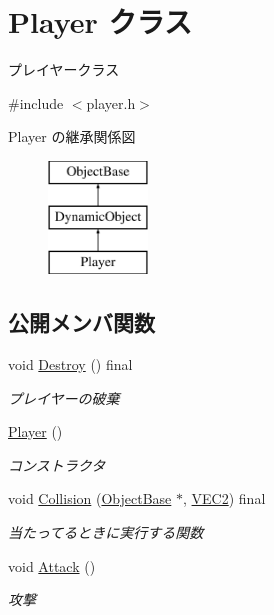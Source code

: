 \hypertarget{class_player}{}\section{Player クラス}
\label{class_player}


プレイヤークラス  




{\ttfamily \#include $<$player.\+h$>$}

Player の継承関係図\begin{figure}[H]
\begin{center}
\leavevmode
\includegraphics[height=3.000000cm]{class_player}
\end{center}
\end{figure}
\subsection*{公開メンバ関数}
\begin{DoxyCompactItemize}
\item 
void \mbox{\hyperlink{class_player_af2cf4936165ef12cce96f7994e0879df}{Destroy}} () final
\begin{DoxyCompactList}\small\item\em プレイヤーの破棄 \end{DoxyCompactList}\item 
\mbox{\hyperlink{class_player_affe0cc3cb714f6deb4e62f0c0d3f1fd8}{Player}} ()
\begin{DoxyCompactList}\small\item\em コンストラクタ \end{DoxyCompactList}\item 
void \mbox{\hyperlink{class_player_a184fbb2c70e34fb6c6a0c2fc7e0f86c9}{Collision}} (\mbox{\hyperlink{class_object_base}{Object\+Base}} $\ast$, \mbox{\hyperlink{common_8h_afb0c5e21d4133ff4f200992c0b534e1b}{V\+E\+C2}}) final
\begin{DoxyCompactList}\small\item\em 当たってるときに実行する関数 \end{DoxyCompactList}\item 
void \mbox{\hyperlink{class_player_a6c879db24d39d894207e078eb4c56e8d}{Attack}} ()
\begin{DoxyCompactList}\small\item\em 攻撃 \end{DoxyCompactList}\end{DoxyCompactItemize}
